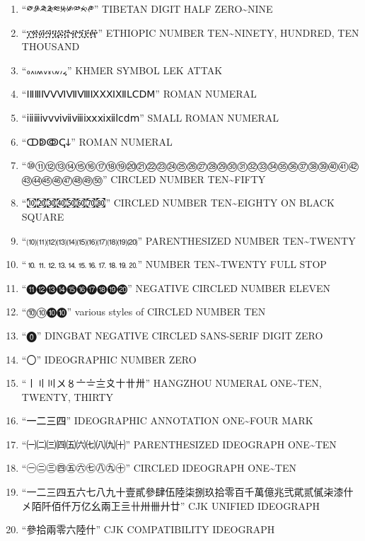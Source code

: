 \documentclass[a4paper,12pt]{article}
\begin{document}
\begin{enumerate}
\begin{itemize}
\begin{enumerate}
\item ``༳༪༫༬༭༮༯༰༱༲''  TIBETAN DIGIT HALF ZERO\textasciitilde{}NINE\\
\item ``፲፳፴፵፶፷፸፹፺፻፼''  ETHIOPIC NUMBER TEN\textasciitilde{}NINETY, HUNDRED, TEN THOUSAND\\
\item ``៰៱៲៳៴៵៶៷៸៹''  KHMER SYMBOL LEK ATTAK\\
\item ``ⅠⅡⅢⅣⅤⅥⅦⅧⅨⅩⅪⅫⅬⅭⅮⅯ''  ROMAN NUMERAL\\
\item ``ⅰⅱⅲⅳⅴⅵⅶⅷⅸⅹⅺⅻⅼⅽⅾⅿ''  SMALL ROMAN NUMERAL\\
\item ``ↀↁↂↅↆ''  ROMAN NUMERAL\\
\item ``⑩⑪⑫⑬⑭⑮⑯⑰⑱⑲⑳㉑㉒㉓㉔㉕㉖㉗㉘㉙㉚㉛㉜㉝㉞㉟㊱㊲㊳㊴㊵㊶㊷㊸㊹㊺㊻㊼㊽㊾㊿''  CIRCLED NUMBER TEN\textasciitilde{}FIFTY\\
\item ``㉈㉉㉊㉋㉌㉍㉎㉏''  CIRCLED NUMBER TEN\textasciitilde{}EIGHTY ON BLACK SQUARE\\
\item ``⑽⑾⑿⒀⒁⒂⒃⒄⒅⒆⒇''  PARENTHESIZED NUMBER TEN\textasciitilde{}TWENTY\\
\item ``⒑⒒⒓⒔⒕⒖⒗⒘⒙⒚⒛''  NUMBER TEN\textasciitilde{}TWENTY FULL STOP\\
\item ``⓫⓬⓭⓮⓯⓰⓱⓲⓳⓴''  NEGATIVE CIRCLED NUMBER ELEVEN\\
\item ``⓾➉❿➓''  various styles of CIRCLED NUMBER TEN\\
\item ``🄌''  DINGBAT NEGATIVE CIRCLED SANS-SERIF DIGIT ZERO\\
\item ``〇''  IDEOGRAPHIC NUMBER ZERO\\
\item ``〡〢〣〤〥〦〧〨〩〸〹〺''  HANGZHOU NUMERAL ONE\textasciitilde{}TEN, TWENTY, THIRTY\\
\item ``㆒㆓㆔㆕''  IDEOGRAPHIC ANNOTATION ONE\textasciitilde{}FOUR MARK\\
\item ``㈠㈡㈢㈣㈤㈥㈦㈧㈨㈩''  PARENTHESIZED IDEOGRAPH ONE\textasciitilde{}TEN\\
\item ``㊀㊁㊂㊃㊄㊅㊆㊇㊈㊉''  CIRCLED IDEOGRAPH ONE\textasciitilde{}TEN\\
\item ``一二三四五六七八九十壹貳參肆伍陸柒捌玖拾零百千萬億兆弐貮贰㒃㭍漆什㐅陌阡佰仟万亿幺兩㠪亖卄卅卌廾廿''  CJK UNIFIED IDEOGRAPH\\
\item ``參拾兩零六陸什''  CJK COMPATIBILITY IDEOGRAPH\\
\end{enumerate}
\end{itemize}


\end{enumerate}
\end{document}
